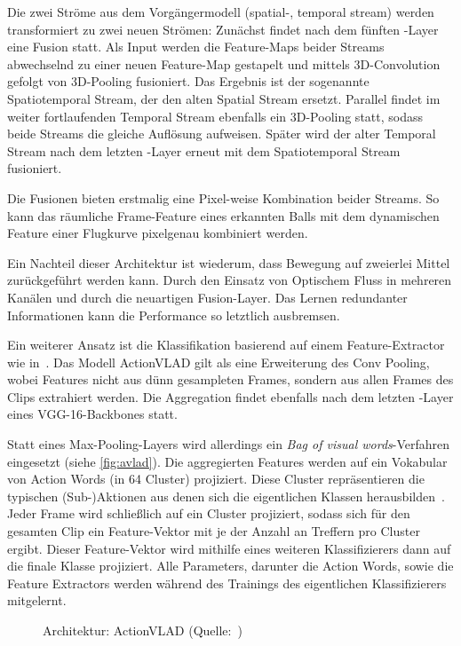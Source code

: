 Die zwei Ströme aus dem Vorgängermodell (spatial-, temporal stream) werden transformiert zu zwei neuen Strömen:
Zunächst findet nach dem fünften \conv-Layer eine Fusion statt.
Als Input werden die Feature-Maps beider Streams abwechselnd zu einer neuen Feature-Map gestapelt und mittels 3D-Convolution gefolgt von 3D-Pooling fusioniert.
Das Ergebnis ist der sogenannte Spatiotemporal Stream, der den alten Spatial Stream ersetzt.
Parallel findet im weiter fortlaufenden Temporal Stream ebenfalls ein 3D-Pooling statt, sodass beide Streams die gleiche Auflösung aufweisen.
Später wird der alter Temporal Stream nach dem letzten \fc-Layer erneut mit dem Spatiotemporal Stream fusioniert.

Die Fusionen bieten erstmalig eine Pixel-weise Kombination beider Streams.
So kann \zB das räumliche Frame-Feature eines erkannten Balls mit dem dynamischen Feature einer Flugkurve pixelgenau kombiniert werden.

Ein Nachteil dieser Architektur ist wiederum, dass Bewegung auf zweierlei Mittel zurückgeführt werden kann.
Durch den Einsatz von Optischem Fluss in mehreren Kanälen und durch die neuartigen Fusion-Layer.
Das Lernen redundanter Informationen kann die Performance so letztlich ausbremsen.

Ein weiterer Ansatz ist die Klassifikation basierend auf einem Feature-Extractor wie in~\cite{Girdhar17}.
Das Modell ActionVLAD gilt als eine Erweiterung des Conv Pooling, wobei Features nicht aus dünn gesampleten Frames, sondern aus allen Frames des Clips extrahiert werden.
Die Aggregation findet ebenfalls nach dem letzten \conv-Layer eines VGG-16-Backbones statt.

Statt eines Max-Pooling-Layers wird allerdings ein \emph{Bag of visual words}-Verfahren eingesetzt (siehe \autoref{fig:avlad}).
Die aggregierten Features werden auf ein Vokabular von Action Words (in 64 Cluster) projiziert.
Diese Cluster repräsentieren die typischen (Sub-)Aktionen aus denen sich die eigentlichen Klassen herausbilden~\cite{Ghosh18}.
Jeder Frame wird schließlich auf ein Cluster projiziert, sodass sich für den gesamten Clip ein Feature-Vektor mit je der Anzahl an Treffern pro Cluster ergibt.
Dieser Feature-Vektor wird mithilfe eines weiteren Klassifizierers dann auf die finale Klasse projiziert.
Alle Parameters, darunter die Action Words, sowie die Feature Extractors werden während des Trainings des eigentlichen Klassifizierers mitgelernt.

\begin{figure}[h!]
    \centering
    \caption{Architektur: ActionVLAD (Quelle:~\cite{Girdhar17})}
    \label{fig:avlad}
\end{figure}

